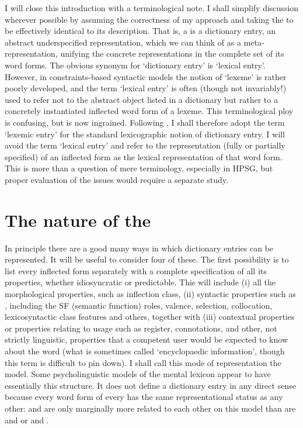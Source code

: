 \documentclass[output=paper]{langsci/langscibook}
\begin{document}
I will close this introduction with a terminological note. I shall simplify discussion wherever possible by assuming the correctness of my approach and taking the  to be effectively identical to its description. That is, a  is a dictionary entry, an abstract underspecified representation, which we can think of as a meta-representation, unifying the concrete representations in the complete set of its word forms. The obvious synonym for `dictionary entry' is  `lexical entry'. However, in constraints-based syntactic models the notion of `lexeme' is rather poorly developed, and the term `lexical entry' is often (though not invariably!) used to refer not to the abstract object listed in a dictionary but rather to a concretely instantiated inflected word form of a lexeme. This terminological ploy is confusing, but is now ingrained.
Following \citet{Dalrymple:etal15:morphology}, I shall therefore  adopt the term `lexemic entry' for the standard lexicographic notion of dictionary entry. I will avoid the term `lexical entry' and refer to the representation (fully or partially specified) of an inflected form as the lexical representation of that word form. This is more than a question of mere terminology, especially in HPSG, but proper evaluation of the issues would require a separate study.


\section{The nature of the }	\label{sec:Spencer:nature}

In principle there are a good many ways  in which dictionary entries can be represented. It will be useful to consider four of these. The first possibility is to list every inflected form separately with a complete specification of all its properties, whether idiosyncratic or predictable. This will include (i) all the morphological properties, such as inflection class, (ii) syntactic properties such as , including the SF (semantic function) roles, valence, selection, collocation, lexicosyntactic class features and others, together with (iii) contextual properties or properties relating to usage such as register, connotations, and other, not strictly linguistic, properties that a competent user would be expected to know about the word (what is sometimes called `encyclopaedic information', though this term is difficult to pin down).  I shall call this mode of representation the  model. Some psycholinguistic models of the mental lexicon appear to have essentially this structure. It does not define a dictionary entry in any direct sense because every word form of every  has the same representational status as any other:
 and  are only marginally more related to each other on this model than are  and  or   and .
\end{document}
